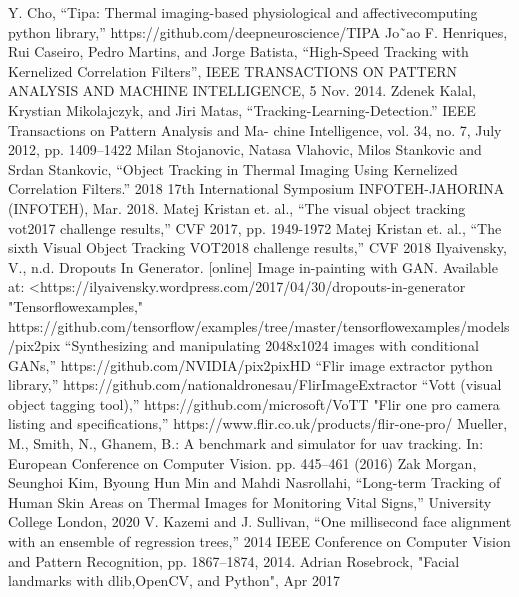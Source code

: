 \documentclass[conference]{IEEEtran}
\begin{document}
\begin{thebibliography}{00}
 Y. Cho, “Tipa: Thermal imaging-based physiological and affectivecomputing python library,” https://github.com/deepneuroscience/TIPA
Jo˜ao F. Henriques, Rui Caseiro, Pedro Martins, and Jorge Batista, “High-Speed Tracking with Kernelized Correlation Filters”, IEEE TRANSACTIONS ON PATTERN ANALYSIS AND MACHINE INTELLIGENCE, 5 Nov. 2014.
Zdenek Kalal, Krystian Mikolajczyk, and Jiri Matas, “Tracking-Learning-Detection.” IEEE Transactions on Pattern Analysis and Ma- chine Intelligence, vol. 34, no. 7, July 2012, pp. 1409–1422
Milan Stojanovic, Natasa Vlahovic, Milos Stankovic and Srdan Stankovic, “Object Tracking in Thermal Imaging Using Kernelized Correlation Filters.” 2018 17th International Symposium INFOTEH-JAHORINA (INFOTEH), Mar. 2018.
Matej Kristan et. al., “The visual object tracking vot2017 challenge results,” CVF 2017, pp. 1949-1972
Matej Kristan et. al., “The sixth Visual Object Tracking VOT2018 challenge results,” CVF 2018
Ilyaivensky, V., n.d. Dropouts In Generator. [online] Image in-painting with GAN. Available at: <https://ilyaivensky.wordpress.com/2017/04/30/dropouts-in-generator
"Tensorflow\textunderscore examples," https://github.com/tensorflow/examples/tree/master/tensorflow\textunderscore examples/models/pix2pix
“Synthesizing and manipulating 2048x1024 images with conditional GANs,” https://github.com/NVIDIA/pix2pixHD
“Flir image extractor python library,” https://github.com/nationaldronesau/FlirImageExtractor
“Vott (visual object tagging tool),” https://github.com/microsoft/VoTT
"Flir one pro camera listing and specifications,” https://www.flir.co.uk/products/flir-one-pro/
Mueller, M., Smith, N., Ghanem, B.: A benchmark and simulator for uav tracking. In: European Conference on Computer Vision. pp. 445–461 (2016)
Zak Morgan, Seunghoi Kim, Byoung Hun Min and Mahdi Nasrollahi, “Long-term Tracking of Human Skin Areas on Thermal Images for Monitoring Vital Signs,” University College London, 2020
V. Kazemi and J. Sullivan, “One millisecond face alignment with an ensemble of regression trees,” 2014 IEEE Conference on Computer Vision and Pattern Recognition, pp. 1867–1874, 2014.
Adrian Rosebrock, "Facial landmarks with dlib,OpenCV, and Python", Apr 2017
\end{thebibliography}
\end{document}
